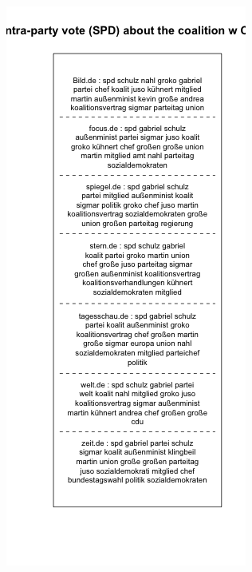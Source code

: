 \documentclass[12pt,a4paper,notitlepage]{article}
\begin{document}
{\begin{figure}[H]
\begin{center}
\begin{subfigure}[normla]{0.49\textwidth}
		\end{subfigure}
		\begin{subfigure}[normla]{0.49\textwidth}
			\includegraphics[width=\textwidth]{../figs/plotquote17.png}
		\end{subfigure}
	\end{center}
\end{figure}

}
\end{document}
